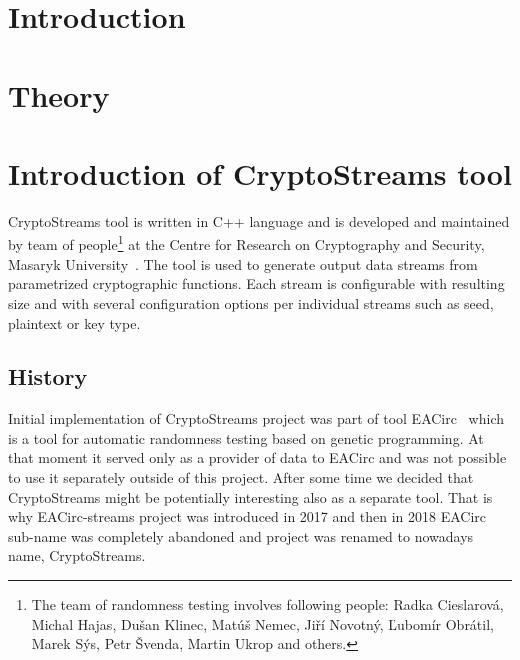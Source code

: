 \documentclass[
    digital,    %
    oneside,    %
    color,
    11pt,
    nocover,
    notable,
    nolof,
    nolot,
    final
]{fithesis3}
\begin{document}
\setlength{\parskip}{5pt}
\setlength{\parindent}{0pt}

\newtheorem{theorem}{Theorem}[section] %
\newtheorem{formula}[theorem]{Formula}     %

\chapter{Introduction}
\label{chap:introduction}


\chapter{Theory}

\chapter{Introduction of CryptoStreams tool}
\label{chap:cryptostreams}

CryptoStreams tool is written in C++ language and is developed and maintained by team of people\footnote{The team of randomness testing involves following people: Radka Cieslarová, Michal Hajas, Dušan Klinec, Matúš Nemec, Jiří Novotný, Ľubomír Obrátil, Marek Sýs, Petr Švenda, Martin Ukrop and others.} at the Centre for Research on Cryptography and Security, Masaryk University~\cite{CryptoStreams}. The tool is used to generate output data streams from parametrized cryptographic functions. Each stream is configurable with resulting size and with several configuration options per individual streams such as seed, plaintext or key type. 

\section{History}

Initial implementation of CryptoStreams project was part of tool EACirc~\cite{EACirc} which is a tool for automatic randomness testing based on genetic programming. At that moment it served only as a provider of data to EACirc and was not possible to use it separately outside of this project. After some time we decided that CryptoStreams might be potentially interesting also as a separate tool. That is why EACirc-streams project was introduced in 2017 and then in 2018 EACirc sub-name was completely abandoned and project was renamed to nowadays name, CryptoStreams.
\end{document}
